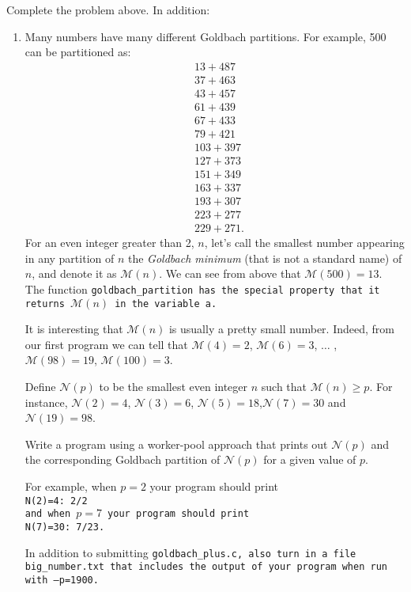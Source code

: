\documentclass{article}
\newcommand{\M}{\mathcal{M}}
\newcommand{\N}{\mathcal{N}}
\begin{document}
\newpage


Complete the problem above.  In addition:

\begin{enumerate}
\item Many numbers have many different Goldbach partitions.  For
  example, 500 can be partitioned as:
\begin{align*}
&	13+487\\
&	37+463\\
&	43+457\\
&	61+439\\
&	67+433\\
&	79+421\\
&	103+397\\
&	127+373\\
&	151+349\\
&	163+337\\
&	193+307\\
&	223+277\\
&	229+271.
\end{align*}
For an even integer greater than 2, $n$, let's call the smallest
number appearing in any partition of $n$ the \textit{Goldbach minimum}
(that is not a standard name)
of $n$, and denote it as $\M(n)$. We can see from above that
$\M(500)=13$. The function \tt{goldbach\_partition} has the special
property that it returns $\M(n)$ in the variable \tt{a}. 

It is interesting that $\M(n)$ is usually a pretty small number. 
Indeed, from our first program we can tell that $\M(4)=2$, $\M(6)=3$,
$\dots$ , $\M(98)=19$, $\M(100)=3$.

Define $\N(p)$ to be the smallest even integer $n$ such that $\M(n)\ge
p$. For instance, $\N(2)=4$, $\N(3)=6$, $\N(5)=18$,$\N(7)=30$ and $\N(19)=98$.

Write a program using a worker-pool approach that prints out $\N(p)$
and the corresponding Goldbach partition of $\N(p)$ for a given value
of $p$. 

For example, when $p=2$ your program should print\\
\tt{N(2)=4: 2/2}\\
and when $p=7$ your program should print\\
\tt{N(7)=30: 7/23}.

In addition to submitting \tt{goldbach\_plus.c}, also turn in a file
\tt{big\_number.txt} that includes the output of your program when run
with \tt{--p=1900}. 


\end{enumerate}
\end{document}
